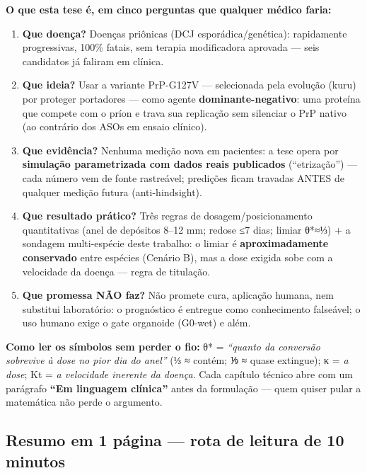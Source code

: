 \documentclass[
  12pt,
]{report}
\providecommand{\tightlist}{%
  \setlength{\itemsep}{0pt}\setlength{\parskip}{0pt}}
\begin{document}
\textbf{O que esta tese é, em cinco perguntas que qualquer médico
faria:}

\begin{enumerate}
\def\labelenumi{\arabic{enumi}.}
\tightlist
\item
  \textbf{Que doença?} Doenças priônicas (DCJ esporádica/genética):
  rapidamente progressivas, 100\% fatais, sem terapia modificadora
  aprovada --- seis candidatos já faliram em clínica.
\item
  \textbf{Que ideia?} Usar a variante PrP-G127V --- selecionada pela
  evolução (kuru) por proteger portadores --- como agente
  \textbf{dominante-negativo}: uma proteína que compete com o príon e
  trava sua replicação sem silenciar o PrP nativo (ao contrário dos ASOs
  em ensaio clínico).
\item
  \textbf{Que evidência?} Nenhuma medição nova em pacientes: a tese
  opera por \textbf{simulação parametrizada com dados reais publicados}
  (``etrização'') --- cada número vem de fonte rastreável; predições
  ficam travadas ANTES de qualquer medição futura (anti-hindsight).
\item
  \textbf{Que resultado prático?} Três regras de dosagem/posicionamento
  quantitativas (anel de depósitos 8--12 mm; redose ≤7 dias; limiar
  θ*≈⅓) + a sondagem multi-espécie deste trabalho: o limiar é
  \textbf{aproximadamente conservado} entre espécies (Cenário B), mas a
  dose exigida sobe com a velocidade da doença --- regra de titulação.
\item
  \textbf{Que promessa NÃO faz?} Não promete cura, aplicação humana, nem
  substitui laboratório: o prognóstico é entregue como conhecimento
  falseável; o uso humano exige o gate organoide (G0-wet) e além.
\end{enumerate}

\textbf{Como ler os símbolos sem perder o fio:} θ* = \emph{``quanto da
conversão sobrevive à dose no pior dia do anel''} (⅓ ≈ contém; ⅑ ≈ quase
extingue); κ = \emph{a dose}; Kt = \emph{a velocidade inerente da
doença}. Cada capítulo técnico abre com um parágrafo \textbf{``Em
linguagem clínica''} antes da formulação --- quem quiser pular a
matemática não perde o argumento.

\hypertarget{resumo-em-1-puxe1gina-rota-de-leitura-de-10-minutos}{%
\subsection{Resumo em 1 página --- rota de leitura de 10
minutos}\label{resumo-em-1-puxe1gina-rota-de-leitura-de-10-minutos}}
\end{document}
